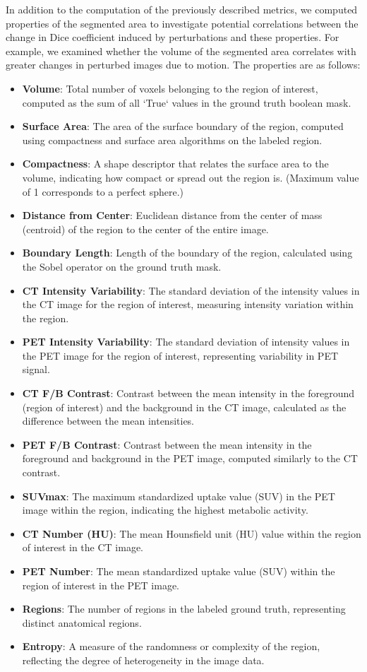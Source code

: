 In addition to the computation of the previously described metrics, we computed properties of the segmented area to 
investigate potential correlations between the change in Dice coefficient induced by perturbations and these properties. 
For example, we examined whether the volume of the segmented area correlates with greater changes in perturbed images due 
to motion. The properties are as follows:
\begin{itemize}
    \setlength\itemsep{1pt} 
    \setlength\parskip{0pt} 
    \setlength\topsep{0pt} 
    \item \textbf{Volume}: Total number of voxels belonging to the region of interest, computed as the sum of all `True` values in the ground truth boolean mask.
    \item \textbf{Surface Area}: The area of the surface boundary of the region, computed using compactness and surface area algorithms on the labeled region.
    \item \textbf{Compactness}: A shape descriptor that relates the surface area to the volume, indicating how compact or spread out the region is. (Maximum value of 1 corresponds to a perfect sphere.)
    \item \textbf{Distance from Center}: Euclidean distance from the center of mass (centroid) of the region to the center of the entire image.
    \item \textbf{Boundary Length}: Length of the boundary of the region, calculated using the Sobel operator on the ground truth mask.
    \item \textbf{CT Intensity Variability}: The standard deviation of the intensity values in the CT image for the region of interest, measuring intensity variation within the region.
    \item \textbf{PET Intensity Variability}: The standard deviation of intensity values in the PET image for the region of interest, representing variability in PET signal.
    \item \textbf{CT F/B Contrast}: Contrast between the mean intensity in the foreground (region of interest) and the background in the CT image, calculated as the difference between the mean intensities.
    \item \textbf{PET F/B Contrast}: Contrast between the mean intensity in the foreground and background in the PET image, computed similarly to the CT contrast.
    \item \textbf{SUVmax}: The maximum standardized uptake value (SUV) in the PET image within the region, indicating the highest metabolic activity.
    \item \textbf{CT Number (HU)}: The mean Hounsfield unit (HU) value within the region of interest in the CT image.
    \item \textbf{PET Number}: The mean standardized uptake value (SUV) within the region of interest in the PET image.
    \item \textbf{Regions}: The number of regions in the labeled ground truth, representing distinct anatomical regions.
    \item \textbf{Entropy}: A measure of the randomness or complexity of the region, reflecting the degree of heterogeneity in the image data.
\end{itemize}

